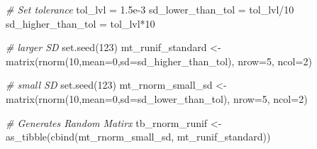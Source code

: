 \documentclass[
]{book}
\newenvironment{Shaded}{\begin{snugshade}}{\end{snugshade}}
\newcommand{\AttributeTok}[1]{\textcolor[rgb]{0.77,0.63,0.00}{#1}}
\newcommand{\CommentTok}[1]{\textcolor[rgb]{0.56,0.35,0.01}{\textit{#1}}}
\newcommand{\DecValTok}[1]{\textcolor[rgb]{0.00,0.00,0.81}{#1}}
\newcommand{\FloatTok}[1]{\textcolor[rgb]{0.00,0.00,0.81}{#1}}
\newcommand{\FunctionTok}[1]{\textcolor[rgb]{0.00,0.00,0.00}{#1}}
\newcommand{\NormalTok}[1]{#1}
\newcommand{\OtherTok}[1]{\textcolor[rgb]{0.56,0.35,0.01}{#1}}
\newcommand{\SpecialCharTok}[1]{\textcolor[rgb]{0.00,0.00,0.00}{#1}}
\begin{document}
\begin{Shaded}
\begin{Highlighting}[]
\CommentTok{\# Set tolerance }
\NormalTok{tol\_lvl }\OtherTok{=} \FloatTok{1.5e{-}3}
\NormalTok{sd\_lower\_than\_tol }\OtherTok{=}\NormalTok{ tol\_lvl}\SpecialCharTok{/}\DecValTok{10}
\NormalTok{sd\_higher\_than\_tol }\OtherTok{=}\NormalTok{ tol\_lvl}\SpecialCharTok{*}\DecValTok{10}

\CommentTok{\# larger SD}
\FunctionTok{set.seed}\NormalTok{(}\DecValTok{123}\NormalTok{)}
\NormalTok{mt\_runif\_standard }\OtherTok{\textless{}{-}} \FunctionTok{matrix}\NormalTok{(}\FunctionTok{rnorm}\NormalTok{(}\DecValTok{10}\NormalTok{,}\AttributeTok{mean=}\DecValTok{0}\NormalTok{,}\AttributeTok{sd=}\NormalTok{sd\_higher\_than\_tol), }\AttributeTok{nrow=}\DecValTok{5}\NormalTok{, }\AttributeTok{ncol=}\DecValTok{2}\NormalTok{)}

\CommentTok{\# small SD}
\FunctionTok{set.seed}\NormalTok{(}\DecValTok{123}\NormalTok{)}
\NormalTok{mt\_rnorm\_small\_sd }\OtherTok{\textless{}{-}} \FunctionTok{matrix}\NormalTok{(}\FunctionTok{rnorm}\NormalTok{(}\DecValTok{10}\NormalTok{,}\AttributeTok{mean=}\DecValTok{0}\NormalTok{,}\AttributeTok{sd=}\NormalTok{sd\_lower\_than\_tol), }\AttributeTok{nrow=}\DecValTok{5}\NormalTok{, }\AttributeTok{ncol=}\DecValTok{2}\NormalTok{)}

\CommentTok{\# Generates Random Matirx}
\NormalTok{tb\_rnorm\_runif }\OtherTok{\textless{}{-}} \FunctionTok{as\_tibble}\NormalTok{(}\FunctionTok{cbind}\NormalTok{(mt\_rnorm\_small\_sd, mt\_runif\_standard))}


\end{Highlighting}
\end{Shaded}
\end{document}
